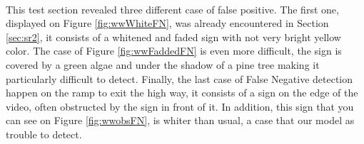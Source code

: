 \paragraph{}
This test section revealed three different case of false positive. The first one, displayed on Figure \ref{fig:wwWhiteFN}, was already encountered in Section \ref{sec:sr2}, it consists of a whitened and faded sign with not very bright yellow color. The case of Figure \ref{fig:wwFaddedFN} is even more difficult, the sign is covered by a green algae and under the shadow of a pine tree making it particularly difficult to detect. Finally, the last case of False Negative detection happen on the ramp to exit the high way, it consists of a sign on the edge of the video, often obstructed by the sign in front of it. In addition, this sign that you can see on Figure \ref{fig:wwobsFN}, is whiter than usual, a case that our model as trouble to detect.
